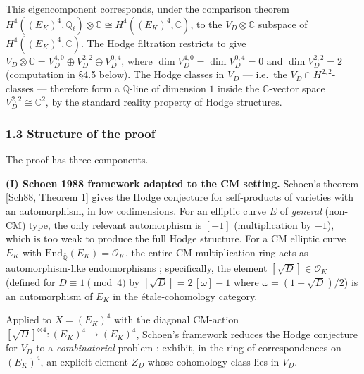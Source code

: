 \documentclass[
  11pt,
  a4paper,
]{amsart}
\begin{document}
This eigencomponent corresponds, under the comparison theorem \(H^4((E_K)^4, \mathbb{Q}_\ell) \otimes \mathbb{C} \cong H^4((E_K)^4, \mathbb{C})\), to the \(V_D \otimes \mathbb{C}\) subspace of \(H^4((E_K)^4, \mathbb{C})\). The Hodge filtration restricts to give \(V_D \otimes \mathbb{C} = V_D^{4,0} \oplus V_D^{2,2} \oplus V_D^{0,4}\), where \(\dim V_D^{4,0} = \dim V_D^{0,4} = 0\) and \(\dim V_D^{2,2} = 2\) (computation in §4.5 below). The Hodge classes in \(V_D\) --- i.e.~the \(V_D \cap H^{2,2}\)-classes --- therefore form a \(\mathbb{Q}\)-line of dimension \(1\) inside the \(\mathbb{C}\)-vector space \(V_D^{2,2} \cong \mathbb{C}^2\), by the standard reality property of Hodge structures.

\hypertarget{structure-of-the-proof}{%
\subsubsection{1.3 Structure of the proof}\label{structure-of-the-proof}}

The proof has three components.

\textbf{(I) Schoen 1988 framework adapted to the CM setting.} Schoen's theorem {[}Sch88, Theorem 1{]} gives the Hodge conjecture for self-products of varieties with an automorphism, in low codimensions. For an elliptic curve \(E\) of \emph{general} (non-CM) type, the only relevant automorphism is \([-1]\) (multiplication by \(-1\)), which is too weak to produce the full Hodge structure. For a CM elliptic curve \(E_K\) with \(\mathrm{End}_{\bar{\mathbb{Q}}}(E_K) = \mathcal{O}_K\), the entire CM-multiplication ring acts as automorphism-like endomorphisms ; specifically, the element \([\sqrt D] \in \mathcal{O}_K\) (defined for \(D \equiv 1 \pmod 4\) by \([\sqrt D] = 2\,[\omega] - 1\) where \(\omega = (1 + \sqrt D)/2\)) is an automorphism of \(E_K\) in the étale-cohomology category.

Applied to \(X = (E_K)^4\) with the diagonal CM-action \([\sqrt D]^{\otimes 4} : (E_K)^4 \to (E_K)^4\), Schoen's framework reduces the Hodge conjecture for \(V_D\) to a \emph{combinatorial} problem : exhibit, in the ring of correspondences on \((E_K)^4\), an explicit element \(Z_D\) whose cohomology class lies in \(V_D\).
\end{document}
